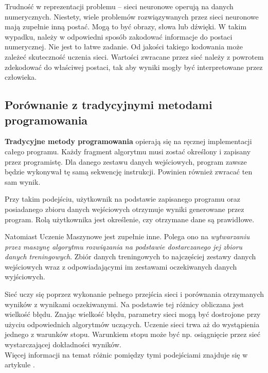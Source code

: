 \begin{enumerate*}
\begin{enumerate*}
\item Trudność w reprezentacji problemu -- sieci neuronowe operują na danych numerycznych. Niestety, wiele problemów rozwiązywanych przez sieci neuronowe mają zupełnie inną postać. Mogą to być obrazy, słowa lub dźwięki. W takim wypadku, należy w odpowiedni sposób zakodować informacje do postaci numerycznej. Nie jest to łatwe zadanie. Od jakości takiego kodowania może zależeć skuteczność uczenia sieci.
Wartości zwracane przez sieć należy z powrotem zdekodować do właściwej postaci, tak aby wyniki mogły być interpretowane przez człowieka.
\end{enumerate*}
\end{enumerate*}

\subsection{Porównanie z tradycyjnymi metodami programowania}
\textbf{Tradycyjne metody programowania} opierają się na ręcznej implementacji całego programu. Każdy fragment algorytmu musi zostać określony i zapisany przez programistę. Dla danego zestawu danych wejściowych, program zawsze będzie wykonywał tę samą sekwencję instrukcji. Powinien również zwracać ten sam wynik.

Przy takim podejściu, użytkownik na podstawie zapisanego programu oraz posiadanego zbioru danych wejściowych otrzymuje wyniki generowane przez program. Rolą użytkownika jest określenie, czy otrzymane dane są prawidłowe.

Natomiast Uczenie Maszynowe jest zupełnie inne. Polega ono na \textit{wytwarzaniu przez maszynę algorytmu rozwiązania na podstawie dostarczanego jej zbioru danych treningowych}. Zbiór danych treningowych to najczęściej zestawy danych wejściowych wraz z odpowiadającymi im zestawami oczekiwanych danych wyjściowych.

Sieć uczy się poprzez wykonanie pełnego przejścia sieci i porównania otrzymanych wyników z wynikami oczekiwanymi. Na podstawie tej różnicy obliczana jest wielkość błędu. Znając wielkość błędu, parametry sieci mogą być dostrojone przy użyciu odpowiednich algorytmów uczących. Uczenie sieci trwa aż do wystąpienia jednego z warunków stopu. Warunkiem stopu może być np. osiągnięcie przez sieć wystarczającej dokładności wyników. \\
Więcej informacji na temat różnic pomiędzy tymi podejściami znajduje się w artykule \cite{mlVersusTradition}.


